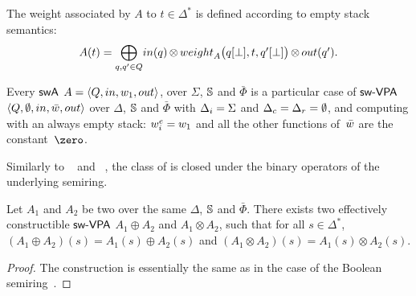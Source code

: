 %

\noindent
The weight associated by $A$ to $t \in \Delta^*$
is defined according to empty stack semantics:
%
\begin{equation}
A(t)  =
{\displaystyle\bigoplus_{q, q' \in Q}} \textstyle
\mathsf{in}(q) \mathop{\otimes}
\weight_A\bigl(\config{q}{\bot}, t, \config{q'}{\bot}\bigr)
\mathop{\otimes} \mathsf{out}(q').
\label{eq:SWVPA-value}
\end{equation}

\noindent
Every $\textsf{swA}$ $A = \< Q, \init, {\wei_1}, \final >$,
over $\Sigma$, $\mathbb{S}$ and $\bar\Phi$
is a particular case of $\textsf{sw-VPA}$
$\< Q, \emptyset, \init, \bar\wei, \final >$
over $\Delta$, $\mathbb{S}$ and $\bar\Phi$
with $\Deltai = \Sigma$ and $\Deltac = \Deltar = \emptyset$,
and computing with an always empty stack:
$\weiei = \wei_1$ and all the other functions
of~$\bar\wei$ are the constant~$\zero$.


\medskip\noindent
Similarly to \VPA~\cite{AlurMadhusudan09nested}
and \SVPA~\cite{dAntonyAlur14SVPDA},
the class of \SWVPA is closed under the binary operators of the underlying semiring.
%
\begin{proposition}\label{prop:SWVPA-product}
Let $A_1$ and $A_2$ be two \SWVPA
over the same $\Delta$, $\mathbb{S}$ and $\bar\Phi$.
There exists two effectively constructible $\textsf{sw-VPA}$
$A_1 \oplus A_2$ and $A_1 \otimes A_2$,
such that for all $s \in \Delta^*$,
$(A_1 \oplus A_2)(s) = A_1(s) \oplus A_2(s)$ and
$(A_1 \otimes A_2)(s) = A_1(s) \otimes A_2(s)$.
\end{proposition}
%
\begin{proof}
The construction is essentially the same
as in the case of the Boolean semiring~\cite{dAntonyAlur14SVPDA}.
\end{proof}

